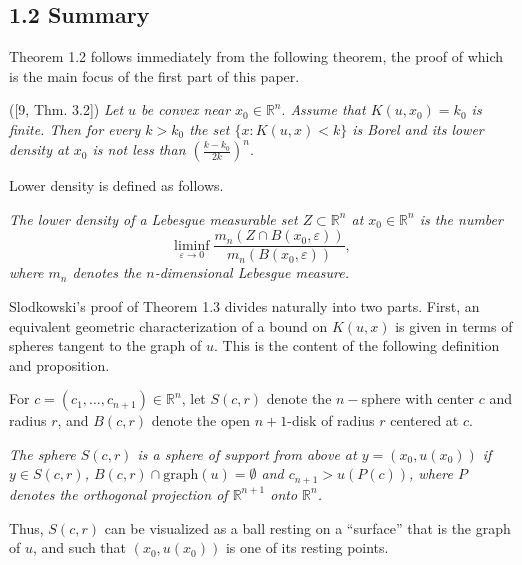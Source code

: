 \documentclass[10pt]{article}
\newenvironment{theorem}[2][Theorem]{\begin{trivlist}
\item[\hskip \labelsep {\bfseries #1}\hskip \labelsep {\bfseries #2.}]}{\end{trivlist}}
\newenvironment{definition}[2][Definition]{\begin{trivlist}
\item[\hskip \labelsep {\bfseries #1}\hskip \labelsep {\bfseries #2.}]}{\end{trivlist}}
\begin{document}
\subsection{1.2 Summary}
Theorem 1.2 follows immediately from the following theorem, the proof of which is the main focus of the first part of this paper.
\begin{theorem}{1.3} 
([9, Thm. 3.2])\textit{ Let $u$ be convex near $x_0\in \mathbb{R}^{n}.$ Assume that $K(u,x_0)=k_0$ is finite. Then for every $k>k_0$ the set $\{x :K(u,x)<k\}$ is Borel and its lower density at $x_0$ is not less than $\left(\frac{k-k_0}{2k}\right)^n.$}
\end{theorem}
Lower density is defined as follows.
\begin{definition} {1.4} \textit{The lower density of a Lebesgue measurable set $Z\subset \mathbb{R}^{n}$ at $x_0 \in \mathbb{R}^{n}$ is the number
$$ \liminf_{\varepsilon \rightarrow 0} \dfrac{m_n \left( Z\cap B(x_0,\varepsilon) \right)}{m_{n}\left(B(x_0,\varepsilon) \right)},$$
 where $m_{n}$ denotes the $n$-dimensional Lebesgue measure.}
\end{definition}

Slodkowski's proof of Theorem 1.3 divides naturally into two parts. First, an equivalent geometric characterization of a bound on $K(u,x)$ is given in terms of spheres tangent to the graph of $u$. This is the content of the following definition and proposition.

For $c=(c_1,\dots,c_{n+1})\in \mathbb{R}^n$, let $S(c,r)$ denote the $n-$sphere with center $c$ and radius $r$, and $B(c,r)$ denote the open $n+1$-disk of radius $r$ centered at $c$.
\begin{definition} {1.5}
\textit{The sphere $S(c,r)$ is a sphere of support from above at $y=(x_0,u(x_0))$ if $y\in S(c,r)$, $B(c,r) \cap \text{graph}(u)=\emptyset$ and $c_{n+1}>u(P(c))$, where $P$ denotes the orthogonal projection of $\mathbb{R}^{n+1}$ onto $\mathbb{R}^n$.}
\end{definition}

Thus, $S(c,r)$ can be visualized as a ball resting on a \textquotedblleft surface\textquotedblright \hspace{1mm} that is the graph of $u$, and such that $(x_0,u(x_0))$ is one of its resting points.
\end{document}
